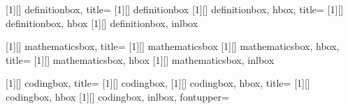 [1][]{
    definitionbox,
    title=
}
[1][]{
    definitionbox
}
[1][]{
    definitionbox,
    hbox,
    title=
    }
[1][]{
    definitionbox,
    hbox
}
\newtcbox{\inldefbox}[1][]{
    definitionbox,
    inlbox
}

[1][]{
    mathematicsbox,
    title=
}
[1][]{
    mathematicsbox
}
[1][]{
    mathematicsbox,
    hbox,
    title=
    }
[1][]{
    mathematicsbox,
    hbox
}
\newtcbox{\inlmathbox}[1][]{
    mathematicsbox,
    inlbox
}

[1][]{
    codingbox,
    title=
}
[1][]{
    codingbox,
}
[1][]{
    codingbox,
    hbox,
    title=
    }
[1][]{
    codingbox,
    hbox
}
\newtcbox{\inlcodebox}[1][]{
    codingbox,
    inlbox,
    fontupper=\ttfamily
}

\newcommand\defc[1]{{\textbf{\color{\MainColor}#1}}}

\usepackage{parskip} %
\usepackage[toc,sort=use]{glossaries}